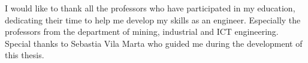 I would like to thank all the professors who have participated in my education, dedicating their time to help me
develop my skills as an engineer. Especially the professors from the department of mining, industrial and ICT engineering.
Special thanks to Sebastia Vila Marta who guided me during the development of this thesis.
